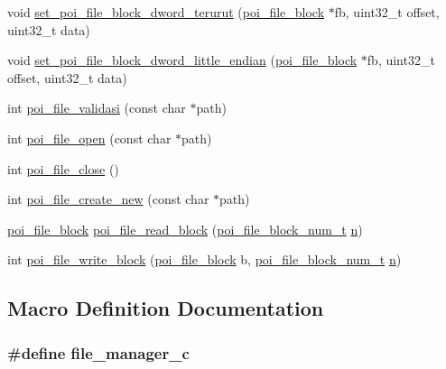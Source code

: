 \begin{DoxyCompactItemize}
\item 
void \hyperlink{file-manager_8c_a384e9cca8b36bc32ca1b92ac410bb7ed}{set\-\_\-poi\-\_\-file\-\_\-block\-\_\-dword\-\_\-terurut} (\hyperlink{structpoi__file__block}{poi\-\_\-file\-\_\-block} $\ast$fb, uint32\-\_\-t offset, uint32\-\_\-t data)
\item 
void \hyperlink{file-manager_8c_aa4d2e01426a89fe14e8c3a9fac2b61a0}{set\-\_\-poi\-\_\-file\-\_\-block\-\_\-dword\-\_\-little\-\_\-endian} (\hyperlink{structpoi__file__block}{poi\-\_\-file\-\_\-block} $\ast$fb, uint32\-\_\-t offset, uint32\-\_\-t data)
\item 
int \hyperlink{file-manager_8c_af091ab9b6704b6affa17ea12fd51e628}{poi\-\_\-file\-\_\-validasi} (const char $\ast$path)
\item 
int \hyperlink{file-manager_8c_ac286b940c82432a07288c7a9afdc884a}{poi\-\_\-file\-\_\-open} (const char $\ast$path)
\item 
int \hyperlink{file-manager_8c_a873cfe2d99ac7a57ff0a391d87c825dd}{poi\-\_\-file\-\_\-close} ()
\item 
int \hyperlink{file-manager_8c_a9a8111f4e7948ad43fef393e0e4e3247}{poi\-\_\-file\-\_\-create\-\_\-new} (const char $\ast$path)
\item 
\hyperlink{structpoi__file__block}{poi\-\_\-file\-\_\-block} \hyperlink{file-manager_8c_ac995e99a526073da84cd4fb1dab93a0a}{poi\-\_\-file\-\_\-read\-\_\-block} (\hyperlink{file-manager_8h_aef709af8fc6566dcaf55b656bb9f8881}{poi\-\_\-file\-\_\-block\-\_\-num\-\_\-t} \hyperlink{allocation-table-test_8c_a24010dade8ebab3f87a48022772cd975}{n})
\item 
int \hyperlink{file-manager_8c_aafd8b089a2a7b6c25cec6ec8c9504e5a}{poi\-\_\-file\-\_\-write\-\_\-block} (\hyperlink{structpoi__file__block}{poi\-\_\-file\-\_\-block} b, \hyperlink{file-manager_8h_aef709af8fc6566dcaf55b656bb9f8881}{poi\-\_\-file\-\_\-block\-\_\-num\-\_\-t} \hyperlink{allocation-table-test_8c_a24010dade8ebab3f87a48022772cd975}{n})
\end{DoxyCompactItemize}


\subsection{Macro Definition Documentation}
\hypertarget{file-manager_8c_a4cf8a8494b61cb9b9cbadc130d35f662}{
\subsubsection[{file\-\_\-manager\-\_\-c}]{\setlength{\rightskip}{0pt plus 5cm}\#define file\-\_\-manager\-\_\-c}}\label{file-manager_8c_a4cf8a8494b61cb9b9cbadc130d35f662}


